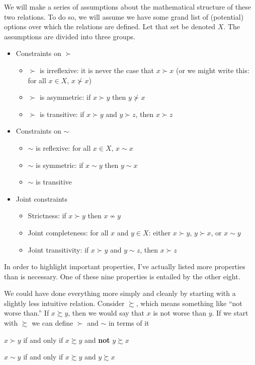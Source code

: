We will make a series of assumptions about the mathematical structure of these two relations.   To do so, we will assume we have some grand list of (potential) options over which the relations are defined.  Let that set be denoted $X$. The assumptions are divided into three groups.
\begin{itemize}
    \item Constraints on $\succ$
    \begin{itemize}
        \item $\succ$ is irreflexive: it is never the case that $x \succ x$ (or we might write this: for all $x \in X$, $x \nsucc x$)

        
        \item $\succ$ is asymmetric: if $x \succ y$ then $y \nsucc x$
        \item $\succ$ is transitive: if $x \succ y$ and $y \succ z$, then $x \succ z$
    \end{itemize}
    \item Constraints on $\sim$
    \begin{itemize}
        \item $\sim$ is reflexive: for all $x \in X$, $x \sim x$
        \item $\sim$ is symmetric: if $x \sim y$ then $y \sim x$
        \item $\sim$ is transitive
    \end{itemize}
    \item Joint constraints
    \begin{itemize}
        \item Strictness: if $x \succ y$ then $x \nsim y$
        \item Joint completeness: for all $x$ and $y \in X$: either $x \succ y$, $y \succ x$, or $x \sim y$
        \item Joint transitivity: if $x \succ y$ and $y \sim z$, then $x \succ z$
    \end{itemize}
\end{itemize}

 In order to highlight important properties, I've actually listed more properties than is necessary.  One of these nine properties is entailed by the other eight.

We could have done everything more simply and cleanly by starting with a slightly less intuitive relation.  Consider $\succsim$, which means something like ``not worse than.''  If $x \succsim y$, then we would say that $x$ is not worse than $y$.  If we start with $\succsim$ we can define $\succ$ and $\sim$ in terms of it
\begin{definition}
\label{d:succ}
$x \succ y$ if and only if $x \succsim y$ and {\bf not} $y \succsim x$
\end{definition}
\begin{definition}
\label{d:sim}
$x \sim y$ if and only if $x \succsim y$ and $y \succsim x$
\end{definition}

